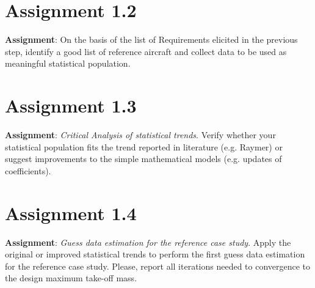 \documentclass{article}
\begin{document}
\section{Assignment 1.2}
\textbf{Assignment}: On the basis of the list of Requirements elicited
in the previous step, identify a good list of reference aircraft and
collect data to be used as meaningful statistical population.

\section{Assignment 1.3}
\textbf{Assignment}: \textit{Critical Analysis of statistical trends}.
Verify whether your statistical population fits the trend reported in
literature (e.g. Raymer) or suggest improvements to the simple
mathematical models (e.g. updates of coefficients).

\section{Assignment 1.4}
\textbf{Assignment}: \textit{Guess data estimation for the reference
case study}. Apply the original or improved statistical trends to
perform the first guess data estimation for the reference case
study. Please, report all iterations needed to convergence to the
design maximum take-off mass.
\pagebreak

\printbibliography
    
\end{document}
